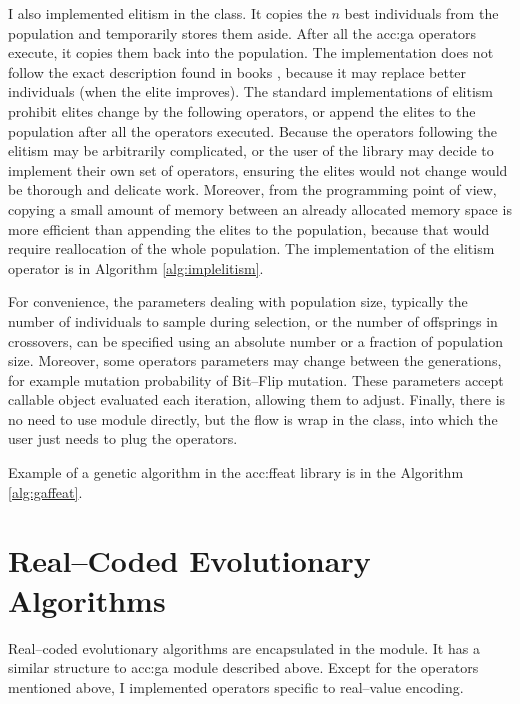 I also implemented elitism in the  class. It copies the $n$ best individuals from the population and temporarily stores them aside. After all the \acrshort{acc:ga} operators execute, it copies them back into the population. The implementation does not follow the exact description found in books \citep{IntroductionToEA}, because it may replace better individuals (when the elite improves). The standard implementations of elitism prohibit elites change by the following operators, or append the elites to the population after all the operators executed. 
Because the operators following the elitism may be arbitrarily complicated, or the user of the library may decide to implement their own set of operators, ensuring the elites would not change would be thorough and delicate work.
Moreover, from the \gpu programming point of view, copying a small amount of memory between an already allocated memory space is more efficient than appending the elites to the population, because that would require reallocation of the whole population. The implementation of the elitism operator is in Algorithm \ref{alg:implelitism}.

For convenience, the parameters dealing with population size, typically the number of individuals to sample during selection, or the number of offsprings in crossovers, can be specified using an absolute number or a fraction of population size. Moreover, some operators parameters may change between the generations, for example mutation probability of Bit--Flip mutation. These parameters accept callable object evaluated each iteration, allowing them to adjust. Finally, there is no need to use  module directly, but the flow is wrap in the  class, into which the user just needs to plug the operators.

Example of a genetic algorithm in the \acrshort{acc:ffeat} library is in the Algorithm \ref{alg:gaffeat}.



\section{Real--Coded Evolutionary Algorithms}

Real--coded evolutionary algorithms are encapsulated in the  module. It has a similar structure to \acrshort{acc:ga} module described above. Except for the operators mentioned above, I implemented operators specific to real--value encoding.

